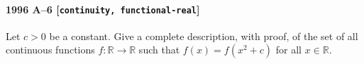 \paragraph{1996 A--6 \textnormal{[\texttt{continuity, functional-real}]}}
Let $c>0$ be a constant. Give a complete description, with proof, of
the set of all continuous functions $f: \mathbb{R} \to \mathbb{R}$ such that $f(x) =
f(x^2+c)$ for all $x \in \mathbb{R}$.
